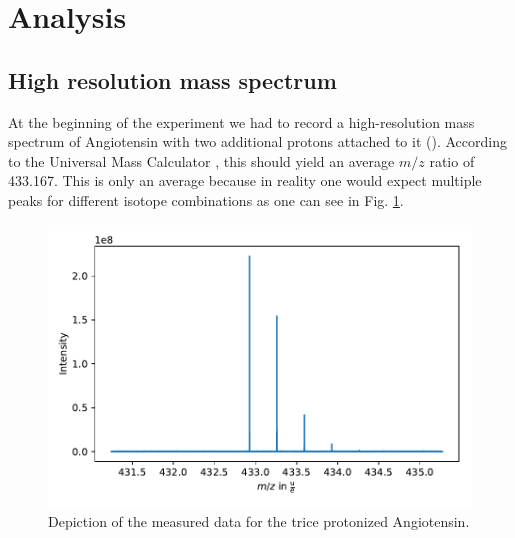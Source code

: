 \documentclass[a4paper,10pt]{article}
\begin{document}
\section{Analysis}

\subsection{High resolution mass spectrum}
At the beginning of the experiment we had to record a high-resolution mass spectrum of Angiotensin with two additional protons attached to it (). According to the Universal Mass Calculator \cite{umc}, this should yield an average $m/z$ ratio of \num{433.167}. This is only an average because in reality one would expect multiple peaks for different isotope combinations as one can see in Fig. \ref{fig_hres_spectroscopy}.

\begin{figure}[H]
	\centering
	\includegraphics[width = 0.8 \textwidth]{hires_spectrum.pdf}
	\caption{Depiction of the measured data for the trice protonized Angiotensin. }
	\label{fig_hres_spectroscopy}
\end{figure}
\end{document}
